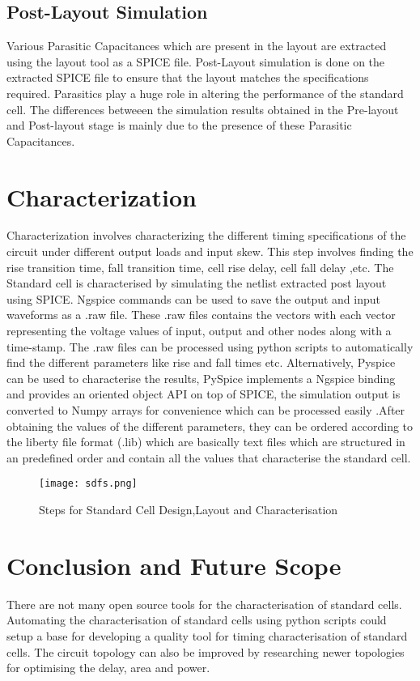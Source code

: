 \documentclass[conference]{IEEEtran}
\begin{document}
\subsection{Post-Layout Simulation}
Various Parasitic Capacitances which are present in the layout are extracted using the layout tool as a SPICE file. Post-Layout simulation is done on the extracted SPICE file to ensure that the layout matches the specifications required. Parasitics play a huge role in altering the performance of the standard cell. The differences betweeen the simulation results obtained in the Pre-layout and Post-layout stage is mainly due to the presence of these Parasitic Capacitances. 
\section{Characterization}
Characterization involves characterizing the different timing specifications of the circuit under different output loads and input skew. This step involves finding the rise transition time, fall transition time,	cell rise delay, cell fall delay ,etc. The Standard cell is characterised by simulating the netlist extracted post layout using SPICE. Ngspice commands can be used to save the output and input waveforms as a .raw file. These .raw files contains the vectors with each vector representing the voltage values of input, output and other nodes along with a time-stamp. The .raw files can be processed using python scripts to automatically find the different parameters like rise and fall times etc. Alternatively, Pyspice can be used to characterise the results, PySpice implements a Ngspice binding and provides an oriented object API on top of SPICE, the simulation output is converted to Numpy arrays for convenience which can be processed easily .After obtaining the values of the different parameters, they can be ordered according to the liberty file format (.lib) which are basically text files which are structured in an predefined order and contain all the values that characterise the standard cell. 
\begin{flushleft}
\begin{figure}[!htb]
\texttt{[image: sdfs.png]}
\caption{Steps for Standard Cell Design,Layout and Characterisation }
\end{figure}
\end{flushleft}
\section{Conclusion and Future Scope}
There are not many open source tools for the characterisation of standard cells. Automating the characterisation of standard cells using python scripts could setup a base for developing a quality tool for timing characterisation of standard cells. The circuit topology can also be improved by researching newer topologies for optimising the delay, area and power.
\end{document}
